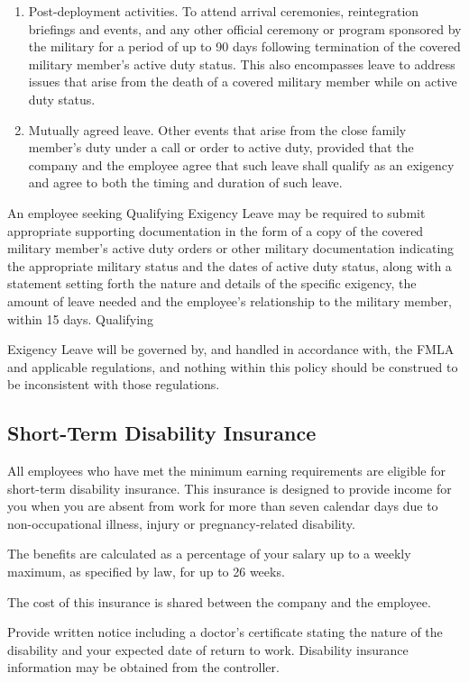 \documentclass{book}
\begin{document}
\begin{enumerate}
\item Post-deployment activities. To attend arrival ceremonies, reintegration briefings and events, and any other official ceremony or program sponsored by the military for a period of up to 90 days following termination of the covered military member’s active duty status. This also encompasses leave to address issues that arise from the death of a covered military member while on active duty status.

\item Mutually agreed leave. Other events that arise from the close family member’s duty under a call or order to active duty, provided that the company and the employee agree that such leave shall qualify as an exigency and agree to both the timing and duration of such leave. \end{enumerate}

An employee seeking Qualifying Exigency Leave may be required to submit appropriate supporting documentation in the form of a copy of the covered military member’s active duty orders or other military documentation indicating the appropriate military status and the dates of active duty status, along with a statement setting forth the nature and details of the specific exigency, the amount of leave needed and the employee's relationship to the military member, within 15 days. Qualifying

Exigency Leave will be governed by, and handled in accordance with, the FMLA and applicable regulations, and nothing within this policy should be construed to be inconsistent with those regulations.

\subsection{Short-Term Disability Insurance}

All employees who have met the minimum earning requirements are eligible for short-term disability insurance. This insurance is designed to provide income for you when you are absent from work for more than seven calendar days due to non-occupational illness, injury or pregnancy-related disability.

The benefits are calculated as a percentage of your salary up to a weekly maximum, as specified by law, for up to 26 weeks.

The cost of this insurance is shared between the company and the employee.

Provide written notice including a doctor's certificate stating the nature of the disability and your expected date of return to work. Disability insurance information may be obtained from the controller.
\end{document}
